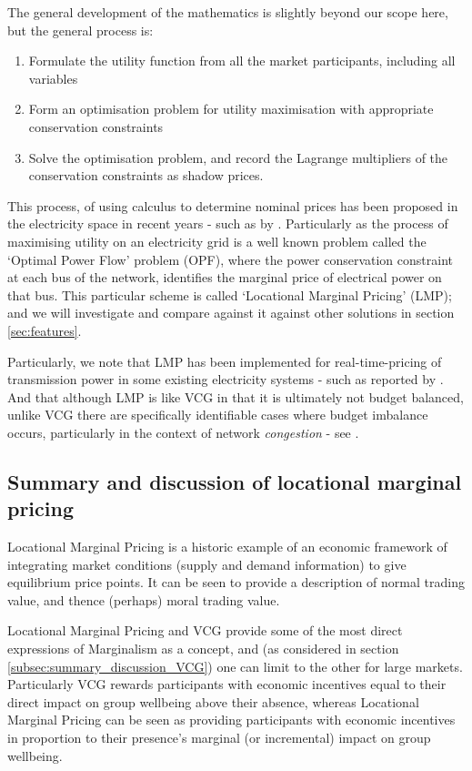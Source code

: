 The general development of the mathematics is slightly beyond our scope here, but the general process is:
\begin{enumerate}
\item Formulate the utility function from all the market participants, including all variables
\item Form an optimisation problem for utility maximisation with appropriate conservation constraints
\item Solve the optimisation problem, and record the Lagrange multipliers of the conservation constraints as shadow prices.
\end{enumerate}
This process, of using calculus to determine nominal prices has been proposed in the electricity space in recent years - such as by \cite{lmp1, lmp2, lmp4, game3}.
Particularly as the process of maximising utility on an electricity grid is a well known problem called the `Optimal Power Flow' problem (OPF), where the power conservation constraint at each bus of the network, identifies the marginal price of electrical power on that bus.
This particular scheme is called `Locational Marginal Pricing' (LMP); and we will investigate and compare against it against other solutions in section \ref{sec:features}.

Particularly, we note that LMP has been implemented for real-time-pricing of transmission power in some existing electricity systems - such as reported by \cite{WANG2015695,zonal}.
And that although LMP is like VCG in that it is ultimately not budget balanced, unlike VCG there are specifically identifiable cases where budget imbalance occurs, particularly in the context of network \textit{congestion} - see \cite{lmp2}.


\subsection{Summary and discussion of locational marginal pricing}

Locational Marginal Pricing is a historic example of an economic framework of integrating market conditions (supply and demand information) to give equilibrium price points.
It can be seen to provide a description of normal trading value, and thence (perhaps) moral trading value.

Locational Marginal Pricing and VCG provide some of the most direct expressions of Marginalism as a concept, and (as considered in section \ref{subsec:summary_discussion_VCG}) one can limit to the other for large markets.
Particularly VCG rewards participants with economic incentives equal to their direct impact on group wellbeing above their absence, whereas Locational Marginal Pricing can be seen as providing participants with economic incentives in proportion to their presence's marginal (or incremental) impact on group wellbeing.

